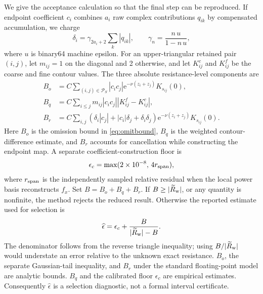 \documentclass[10pt]{article}
\newcommand{\e}{\mathrm{e}}
\begin{document}
We give the acceptance calculation so that the final step can be reproduced.
If endpoint coefficient \(c_i\) combines \(a_i\) raw complex contributions
\(q_{ik}\) by compensated accumulation, we charge
\begin{equation}
 \delta_i=\gamma_{2a_i+2}\sum_k|q_{ik}|,\qquad
 \gamma_n=\frac{n\,u}{1-n\,u},
 \label{eq:coeffround}
\end{equation}
where \(u\) is binary64 machine epsilon.  For an upper-triangular retained
pair \((i,j)\), let \(m_{ij}=1\) on the diagonal and 2 otherwise, and let
\(K^{c}_{ij}\) and \(K^{f}_{ij}\) be the coarse and fine contour values.  The
three absolute resistance-level components are
\begin{align}
 B_o &= C\!\sum_{(i,j)\in\mathcal P_S}
 |c_i c_j|\e^{-\nu(z_i+z_j)}K_{s_{ij}}(0),
 \label{eq:bo}\\
 B_q &= C\!\sum_{i\leq j}m_{ij}|c_i c_j|
 |K^{f}_{ij}-K^{c}_{ij}|,
 \label{eq:bq}\\
 B_r &= C\!\sum_{i,j}
 (\delta_i|c_j|+|c_i|\delta_j+\delta_i\delta_j)
 \e^{-\nu(z_i+z_j)}K_{s_{ij}}(0).
 \label{eq:br}
\end{align}
Here \(B_o\) is the omission bound in \cref{eq:omitbound}, \(B_q\) is the
weighted contour-difference estimate, and \(B_r\) accounts for cancellation
while constructing the endpoint map.  A separate coefficient-construction
floor is
\begin{equation}
 \epsilon_c=\max(2\times10^{-8},\,4r_{\rm span}),
 \label{eq:floor}
\end{equation}
where \(r_{\rm span}\) is the independently sampled relative residual when
the local power basis reconstructs \(f_x\).  Set \(B=B_o+B_q+B_r\).  If
\(B\geq|\widetilde R_{\rm w}|\), or any quantity is nonfinite, the method
rejects the reduced result.  Otherwise the reported estimate used for
selection is
\begin{equation}
 \widehat\epsilon=\epsilon_c+
 \frac{B}{|\widetilde R_{\rm w}|-B}.
 \label{eq:dispatcherror}
\end{equation}
The denominator follows from the reverse triangle inequality; using
\(B/|\widetilde R_{\rm w}|\) would understate an error relative to the unknown
exact resistance.  \(B_o\), the separate Gaussian-tail inequality, and
\(B_r\) under the standard floating-point model are analytic bounds.
\(B_q\) and the calibrated floor \(\epsilon_c\) are empirical estimates.
Consequently \(\widehat\epsilon\) is a selection diagnostic, not a formal
interval certificate.
\end{document}
